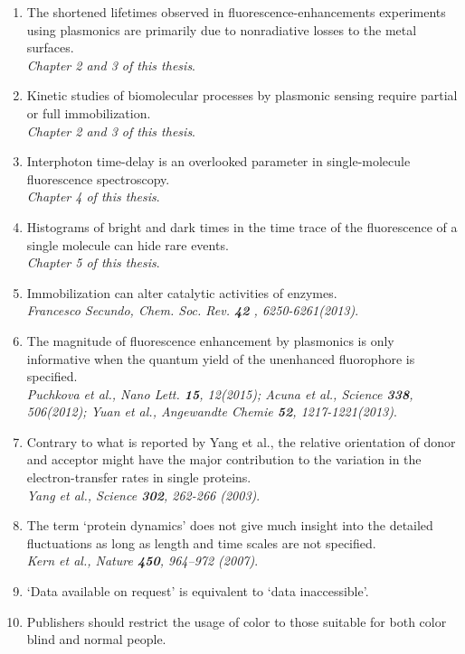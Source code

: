 \documentclass{dissertation}
\begin{document}
\newcommand{\refp}[1]{\\{\it \footnotesize #1}.}
\begin{enumerate}
	\item The shortened lifetimes observed in fluorescence-enhancements experiments using plasmonics are primarily due to nonradiative losses to the metal surfaces.
	\refp{Chapter 2 and 3 of this thesis}
	
	\item Kinetic studies of biomolecular processes by plasmonic sensing require partial or full immobilization. 
	\refp{Chapter 2 and 3 of this thesis}
	
	\item Interphoton time-delay is an overlooked parameter in single-molecule fluorescence spectroscopy.
	\refp{Chapter 4 of this thesis}
	
	\item Histograms of bright and dark times in the time trace of the fluorescence of a single molecule can hide rare events.
	\refp{Chapter 5 of this thesis}
	
	\item Immobilization can alter catalytic activities of enzymes.
	\refp{Francesco Secundo, Chem. Soc. Rev. \textbf{42} , 6250-6261(2013)}
	
	\item The magnitude of fluorescence enhancement by plasmonics is only informative when the quantum yield of the unenhanced fluorophore is specified.
	\refp{Puchkova et al., Nano Lett. \textbf{15}, 12(2015);
		  Acuna et al., Science \textbf{338}, 506(2012);
		  Yuan et al., Angewandte Chemie \textbf{52}, 1217-1221(2013)}

	\item Contrary to what is reported by Yang et al., the relative orientation of donor and acceptor might have the major contribution to the variation in the electron-transfer rates in single proteins.
	\refp{Yang et al., Science \textbf{302}, 262-266 (2003)}
	
	\item The term `protein dynamics' does not give much insight into the detailed fluctuations as long as length and time scales are not specified.
	\refp{Kern et al., Nature \textbf{450}, 964–972 (2007)}
	
	\item `Data available on request' is equivalent to `data inaccessible'.

	\item Publishers should restrict the usage of color to those suitable for both color blind and normal people.
\end{enumerate}
\end{document}

